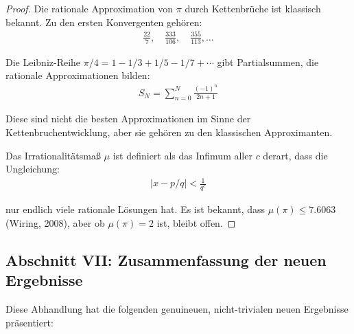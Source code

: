 \documentclass[a4paper,12pt,twoside]{report}
\theoremstyle{definition}
\begin{document}
\begin{proof}
Die rationale Approximation von $\pi$ durch Kettenbrüche ist klassisch bekannt. Zu den ersten Konvergenten gehören:
\begin{align}
	\frac{22}{7}, \quad \frac{333}{106}, \quad \frac{355}{113}, \ldots
\end{align}

Die Leibniz-Reihe $\pi/4 = 1 - 1/3 + 1/5 - 1/7 + \cdots$ gibt Partialsummen, die rationale Approximationen bilden:
\begin{align}
	S_N = \sum_{n=0}^{N} \frac{(-1)^n}{2n+1}
\end{align}

Diese sind nicht die besten Approximationen im Sinne der Kettenbruchentwicklung, aber sie gehören zu den klassischen Approximanten. 

Das Irrationalitätsmaß $\mu$ ist definiert als das Infimum aller $c$ derart, dass die Ungleichung:
\begin{align}
	\left| x - p/q \right| < \frac{1}{q^c}
\end{align}

nur endlich viele rationale Lösungen hat. Es ist bekannt, dass $\mu(\pi) \leq 7.6063$ (Wir­ing, 2008), aber ob $\mu(\pi) = 2$ ist, bleibt offen.
\end{proof}

\subsection{Abschnitt VII: Zusammenfassung der neuen Ergebnisse}

Diese Abhandlung hat die folgenden genuineuen, nicht-trivialen neuen Ergebnisse präsentiert:
\end{document}
